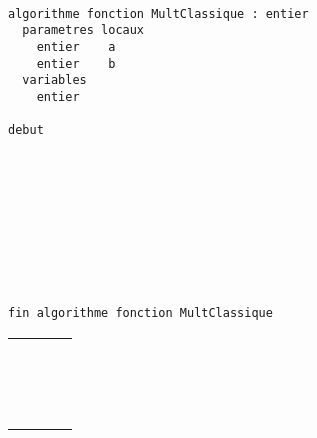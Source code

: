 \documentclass[11pt,a4paper]{article}
\begin{document}
\begin{table}[ht!]
  \centering
  \begin{minipage}{0.59\textwidth}
    \centering
\begin{lstlisting}[style=algorithm]

algorithme fonction MultClassique : entier
  parametres locaux
    entier    a
    entier    b
  variables
    entier    

debut










fin algorithme fonction MultClassique
 \end{lstlisting}
  \end{minipage}
  \hfillx
  \begin{minipage}{0.4\textwidth}
    \centering
    \begin{tabular}{|C{1cm}|C{1cm}|C{1cm}|C{1cm}|}
        \hline
             &     &     &     \\
        \hline
             &     &     &   \\
             &     &     &     \\
             &     &     &   \\
        \hline
             &     &     &   \\
             &     &     &     \\
             &     &     &   \\
        \hline
             &     &     &   \\
             &     &     &     \\
             &     &     &   \\
        \hline
             &     &     &   \\
             &     &     &     \\
             &     &     &   \\
        \hline
             &     &     &   \\
             &     &     &     \\
             &     &     &   \\
        \hline
    \end{tabular}
  \end{minipage}
\end{table}
\end{document}
